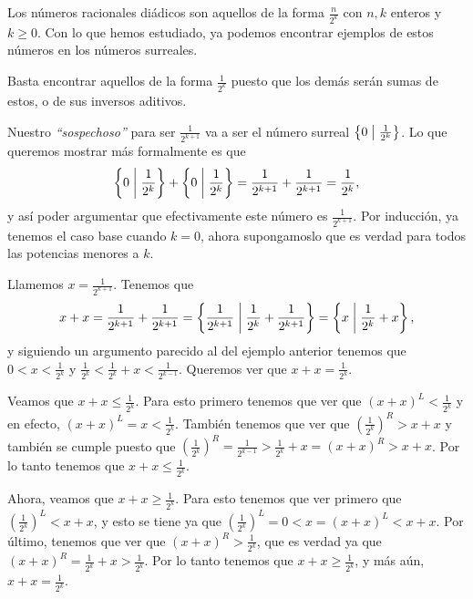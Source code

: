     \begin{example}
        \label{Ex_num_diadicos}
        Los n\'umeros racionales di\'adicos son aquellos de la forma $\frac{n}{2^k}$ con $n, k$ enteros y $k \ge 0$. Con lo que hemos estudiado, ya podemos encontrar ejemplos de estos n\'umeros en los n\'umeros surreales.

        Basta encontrar aquellos de la forma $\frac{1}{2^k}$ puesto que los dem\'as ser\'an sumas de estos, o de sus inversos aditivos.

        Nuestro \textit{``sospechoso''} para ser $\frac{1}{2^{k+1}}$ va a ser el n\'umero surreal $\left\{0\;\middle|\; \frac{1}{2^k}\right\}$. Lo que queremos mostrar m\'as formalmente es que 
        \[
            \left\{0\;\middle|\; \frac{1}{2^{k}}\right\} + \left\{0\;\middle|\; \frac{1}{2^{k}}\right\} = \frac{1}{2^{k+1}} + \frac{1}{2^{k+1}} = \frac{1}{2^k},
        \]
        y as\'i poder argumentar que efectivamente este n\'umero es $\frac{1}{2^{k+1}}$. Por inducci\'on, ya tenemos el caso base cuando $k=0$, ahora supongamoslo que es verdad para todos las potencias menores a $k$.

        Llamemos $x = \frac{1}{2^{k+1}}$. Tenemos que
        \[
            x + x = \frac{1}{2^{k+1}} + \frac{1}{2^{k+1}} = \left\{\frac{1}{2^{k+1}}\;\middle|\; \frac{1}{2^{k}} +\frac{1}{2^{k+1}}\right\} = \left\{x\;\middle|\; \frac{1}{2^k} + x\right\},
        \]
        y siguiendo un argumento parecido al del ejemplo anterior tenemos que $0 < x < \frac{1}{2^k}$ y $\frac{1}{2^k} < \frac{1}{2^k} + x < \frac{1}{2^{k-1}}$. Queremos ver que $x+x = \frac{1}{2^{k}}$.

        Veamos que $x+x\le \frac{1}{2^k}$. Para esto primero tenemos que ver que $(x+x)^L < \frac{1}{2^k}$ y en efecto, $(x+x)^L = x < \frac{1}{2^k}$. Tambi\'en tenemos que ver que $(\frac{1}{2^k})^R > x+x$ y tambi\'en se cumple puesto que $(\frac{1}{2^k})^R = \frac{1}{2^{k-1}} > \frac{1}{2^k} + x = (x+x)^R > x+x$. Por lo tanto tenemos que $x+x\le \frac{1}{2^k}$.

        Ahora, veamos que $x+x\ge \frac{1}{2^k}$. Para esto tenemos que ver primero que $(\frac{1}{2^k})^L < x+x$, y esto se tiene ya que $(\frac{1}{2^k})^L = 0 < x = (x+x)^L < x+x$. Por \'ultimo, tenemos que ver que $(x+x)^R > \frac{1}{2^k}$, que es verdad ya que $(x+x)^R = \frac{1}{2^k} + x > \frac{1}{2^k}$. Por lo tanto tenemos que $x+x\ge \frac{1}{2^k}$, y m\'as a\'un, $x+x = \frac{1}{2^k}$.

    \end{example}